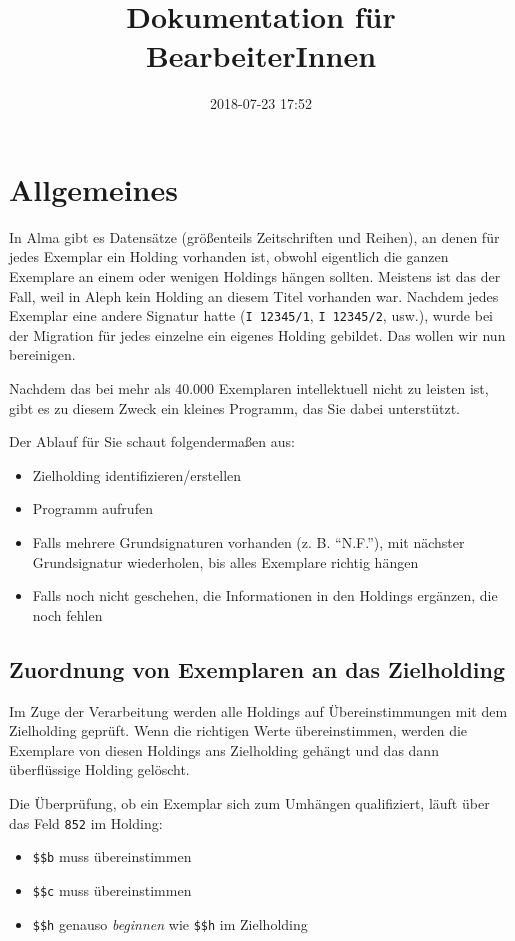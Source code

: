 \documentclass[10pt, a4paper]{scrartcl}
\date{2018-07-23 17:52}
\title{Dokumentation für BearbeiterInnen}
\begin{document}
\maketitle
\tableofcontents

\section{Allgemeines}
\label{sec:org35dbba0}
In Alma gibt es Datensätze (größenteils Zeitschriften und Reihen), an denen
für jedes Exemplar ein Holding vorhanden ist, obwohl eigentlich die ganzen
Exemplare an einem oder wenigen Holdings hängen sollten. Meistens ist das
der Fall, weil in Aleph kein Holding an diesem Titel vorhanden war. Nachdem
jedes Exemplar eine andere Signatur hatte (\texttt{I 12345/1}, \texttt{I 12345/2}, usw.),
wurde bei der Migration für jedes einzelne ein eigenes Holding gebildet. Das
wollen wir nun bereinigen.

Nachdem das bei mehr als 40.000 Exemplaren intellektuell nicht zu leisten
ist, gibt es zu diesem Zweck ein kleines Programm, das Sie dabei
unterstützt.

Der Ablauf für Sie schaut folgendermaßen aus:

\begin{itemize}
\item Zielholding identifizieren/erstellen
\item Programm aufrufen
\item Falls mehrere Grundsignaturen vorhanden (z. B. "`N.F."'), mit nächster
Grundsignatur wiederholen, bis alles Exemplare richtig hängen
\item Falls noch nicht geschehen, die Informationen in den Holdings ergänzen,
die noch fehlen
\end{itemize}

\subsection{Zuordnung von Exemplaren an das Zielholding}
\label{sec:orgdd35de4}
Im Zuge der Verarbeitung werden alle Holdings auf Übereinstimmungen mit dem
Zielholding geprüft. Wenn die richtigen Werte übereinstimmen, werden die
Exemplare von diesen Holdings ans Zielholding gehängt und das dann
überflüssige Holding gelöscht.

Die Überprüfung, ob ein Exemplar sich zum Umhängen qualifiziert, läuft
über das Feld \texttt{852} im Holding:

\begin{itemize}
\item \texttt{\$\$b} muss übereinstimmen
\item \texttt{\$\$c} muss übereinstimmen
\item \texttt{\$\$h} genauso \emph{beginnen} wie \texttt{\$\$h} im Zielholding
\end{itemize}
\end{document}
